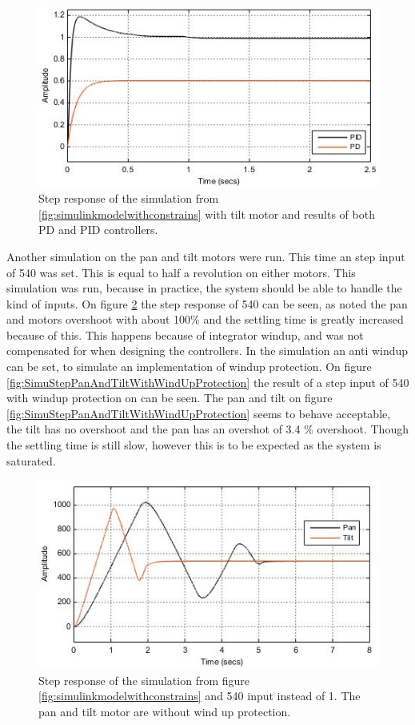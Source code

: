 \begin{figure}[h!]
\centering
\includegraphics[scale=0.7]{Billeder/SimuStepTiltPDAndPID.jpg}
\caption{  Step response of the simulation from \ref{fig:simulinkmodelwithconstrains} with tilt motor and results of both PD and PID controllers.
 }
\label{fig:SimuStepTiltPDAndPID}
\end{figure}


Another simulation on the pan and tilt motors were run. This time an step input of 540 was set. This is equal to half a revolution on either motors. This simulation was run, because in practice,  the system should be able to handle the kind of inputs.
On figure \ref{fig:SimuStepPanAndTiltNoWindUpProtection} the step response of 540 can be seen, as noted the pan and motors overshoot with about 100\% and the settling time is greatly increased because of this. This happens because of integrator windup, and was not compensated for when designing the controllers. In the simulation an anti windup can be set, to simulate an implementation of windup protection. On figure \ref{fig:SimuStepPanAndTiltWithWindUpProtection} the result of a step input of 540 with windup protection on can be seen. The pan and tilt on figure \ref{fig:SimuStepPanAndTiltWithWindUpProtection} seems to behave acceptable, the tilt has no overshoot and the pan has an overshot of 3.4 \% overshoot. Though the settling time is still slow, however this is to be expected as the system is saturated.


\begin{figure}[h!]
\centering
\includegraphics[scale=0.7]{Billeder/SimuStepPanAndTiltNoWindUpProtection.jpg}
\caption{  Step response of the simulation from figure  \ref{fig:simulinkmodelwithconstrains} and 540 input instead of 1. The pan and tilt motor are without wind up protection. }
\label{fig:SimuStepPanAndTiltNoWindUpProtection}
\end{figure}


